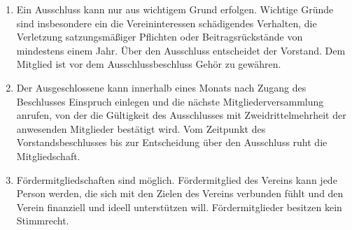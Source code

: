 \documentclass[12pt,a4paper]{article}
\begin{document}
\begin{enumerate}
\item Ein Ausschluss kann nur aus wichtigem Grund erfolgen. Wichtige Gründe sind insbesondere ein die Vereininteressen schädigendes Verhalten, die Verletzung satzungsmäßiger Pflichten oder Beitragsrückstände von mindestens einem Jahr. Über den Ausschluss entscheidet der Vorstand. Dem Mitglied ist vor dem Ausschlussbeschluss Gehör zu gewähren.
\item Der Ausgeschlossene kann innerhalb eines Monats nach Zugang des Beschlusses Einspruch einlegen und die nächste Mitgliederversammlung anrufen, von der die Gültigkeit des Ausschlusses mit Zweidrittelmehrheit der anwesenden Mitglieder bestätigt wird. Vom Zeitpunkt des Vorstandsbeschlusses bis zur Entscheidung über den Ausschluss ruht die Mitgliedschaft.
\item Fördermitgliedschaften sind möglich. Fördermitglied des Vereins kann jede Person werden, die sich mit den Zielen des Vereins verbunden fühlt und den Verein finanziell und ideell unterstützen will. Fördermitglieder besitzen kein Stimmrecht.
\end{enumerate}
\end{document}
